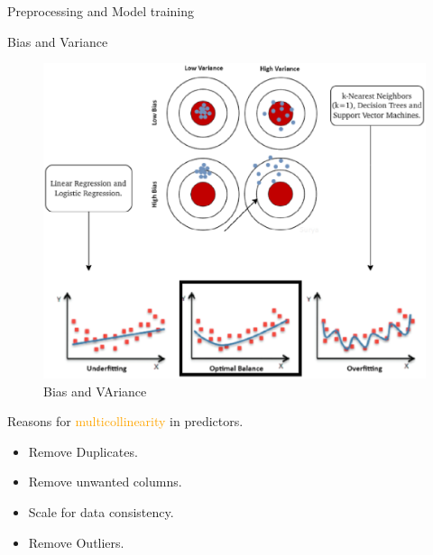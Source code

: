 \documentclass[
 size=14pt,
 paper=smartboard,  %
 mode=present, 		%
 display=slides, 	%
 style=tuliplab,  	%
 pauseslide,
 fleqn,leqno]{powerdot}
\begin{document}


\begin{slide}[toc=,bm=]{Preprocessing and Model training}
  \twocolumn
  {
  Bias and Variance

  \begin{figure}
    \includegraphics[width=0.8\linewidth,height=0.8\linewidth]{graphics//Bias_and_VrarianceAll.eps}
    \caption{Bias and VAriance} \label{Bias}
 \end{figure}
  }
  {
      
      Reasons for \textcolor{orange}{multicollinearity} in predictors.
      
      \begin{itemize}
      \item Remove Duplicates.
      \item Remove unwanted columns.
      \item Scale for data consistency.
      \item Remove Outliers.
      \end{itemize}
  }
  

  
  \end{slide}
\end{document}
